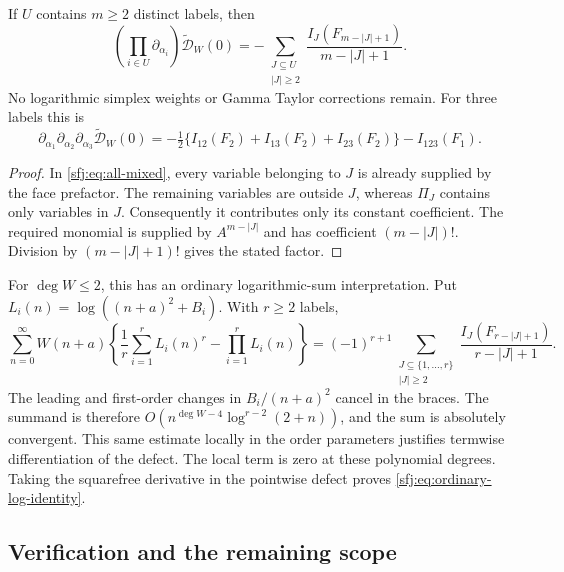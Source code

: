 \begin{corollary}
\label{sfj:cor:squarefree}
If $U$ contains $m\ge2$ distinct labels, then
\begin{equation}\label{sfj:eq:squarefree}
 \boxed{\displaystyle
 \left(\prod_{i\in U}\partial_{\alpha_i}\right)
             \widetilde{\mathscr D}_W(0)
 =-\sum_{\substack{J\subseteq U\\|J|\ge2}}
           \frac{I_J(F_{m-|J|+1})}{m-|J|+1}.}
\end{equation}
No logarithmic simplex weights or Gamma Taylor corrections remain.
For three labels this is
\[
 \partial_{\alpha_1}\partial_{\alpha_2}\partial_{\alpha_3}
          \widetilde{\mathscr D}_W(0)
 =-\tfrac12\{I_{12}(F_2)+I_{13}(F_2)+I_{23}(F_2)\}
                                      -I_{123}(F_1).
\]
\end{corollary}
\begin{proof}
In \eqref{sfj:eq:all-mixed}, every variable belonging to $J$ is
already supplied by the face prefactor.  The remaining variables are
outside $J$, whereas $\Pi_J$ contains only variables in $J$.
Consequently it contributes only its constant coefficient.  The
required monomial is supplied by $A^{m-|J|}$ and has coefficient
$(m-|J|)!$.  Division by $(m-|J|+1)!$ gives the stated factor.
\end{proof}

For $\deg W\le2$, this has an ordinary logarithmic-sum interpretation.
Put $L_i(n)=\log((n+a)^2+B_i)$.  With $r\ge2$ labels,
\begin{equation}\label{sfj:eq:ordinary-log-identity}
 \sum_{n=0}^\infty W(n+a)
    \left\{\frac1r\sum_{i=1}^rL_i(n)^r-\prod_{i=1}^rL_i(n)\right\}
 =(-1)^{r+1}
      \sum_{\substack{J\subseteq\{1,\ldots,r\}\\|J|\ge2}}
           \frac{I_J(F_{r-|J|+1})}{r-|J|+1}.
\end{equation}
The leading and first-order changes in $B_i/(n+a)^2$ cancel in the
braces.  The summand is therefore
$O(n^{\deg W-4}\log^{r-2}(2+n))$, and the sum is absolutely
convergent.  This same estimate locally in the order parameters
justifies termwise differentiation of the defect.  The local term is
zero at these polynomial degrees.  Taking the squarefree derivative
in the pointwise defect proves \eqref{sfj:eq:ordinary-log-identity}.

\subsection{Verification and the remaining scope}

